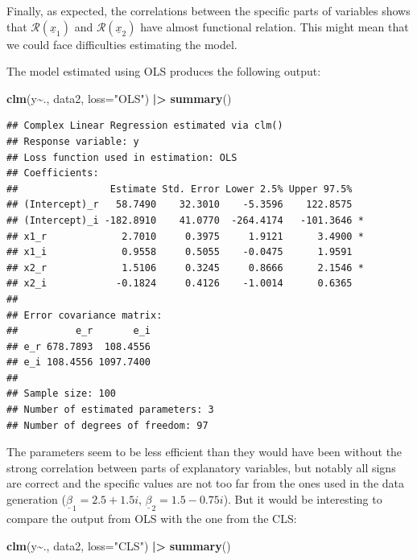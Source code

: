\documentclass[
]{book}
\newenvironment{Shaded}{\begin{snugshade}}{\end{snugshade}}
\newcommand{\DataTypeTok}[1]{\textcolor[rgb]{0.13,0.29,0.53}{#1}}
\newcommand{\ErrorTok}[1]{\textcolor[rgb]{0.64,0.00,0.00}{\textbf{#1}}}
\newcommand{\KeywordTok}[1]{\textcolor[rgb]{0.13,0.29,0.53}{\textbf{#1}}}
\newcommand{\NormalTok}[1]{#1}
\newcommand{\OperatorTok}[1]{\textcolor[rgb]{0.81,0.36,0.00}{\textbf{#1}}}
\newcommand{\StringTok}[1]{\textcolor[rgb]{0.31,0.60,0.02}{#1}}
\begin{document}
Finally, as expected, the correlations between the specific parts of variables shows that \(\mathcal{R}\left(\underline{x}_1\right)\) and \(\mathcal{R}\left(\underline{x}_2\right)\) have almost functional relation. This might mean that we could face difficulties estimating the model.

The model estimated using OLS produces the following output:

\begin{Shaded}
\begin{Highlighting}[]
\KeywordTok{clm}\NormalTok{(y}\OperatorTok{\textasciitilde{}}\NormalTok{., data2, }\DataTypeTok{loss=}\StringTok{"OLS"}\NormalTok{) }\OperatorTok{|}\ErrorTok{\textgreater{}}
\StringTok{    }\KeywordTok{summary}\NormalTok{()}
\end{Highlighting}
\end{Shaded}

\begin{verbatim}
## Complex Linear Regression estimated via clm()
## Response variable: y
## Loss function used in estimation: OLS
## Coefficients:
##                Estimate Std. Error Lower 2.5% Upper 97.5%  
## (Intercept)_r   58.7490    32.3010    -5.3596    122.8575  
## (Intercept)_i -182.8910    41.0770  -264.4174   -101.3646 *
## x1_r             2.7010     0.3975     1.9121      3.4900 *
## x1_i             0.9558     0.5055    -0.0475      1.9591  
## x2_r             1.5106     0.3245     0.8666      2.1546 *
## x2_i            -0.1824     0.4126    -1.0014      0.6365  
## 
## Error covariance matrix:
##          e_r       e_i
## e_r 678.7893  108.4556
## e_i 108.4556 1097.7400
## 
## Sample size: 100
## Number of estimated parameters: 3
## Number of degrees of freedom: 97
\end{verbatim}

The parameters seem to be less efficient than they would have been without the strong correlation between parts of explanatory variables, but notably all signs are correct and the specific values are not too far from the ones used in the data generation (\(\underline{\beta}_1=2.5+1.5i\), \(\underline{\beta}_2=1.5-0.75i\)). But it would be interesting to compare the output from OLS with the one from the CLS:

\begin{Shaded}
\begin{Highlighting}[]
\KeywordTok{clm}\NormalTok{(y}\OperatorTok{\textasciitilde{}}\NormalTok{., data2, }\DataTypeTok{loss=}\StringTok{"CLS"}\NormalTok{) }\OperatorTok{|}\ErrorTok{\textgreater{}}
\StringTok{    }\KeywordTok{summary}\NormalTok{()}
\end{Highlighting}
\end{Shaded}
\end{document}
